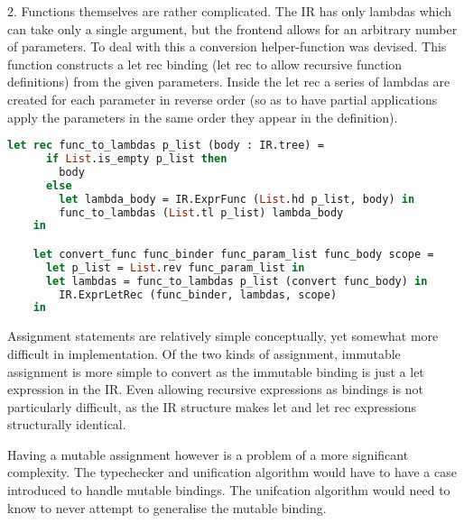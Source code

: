 \documentclass{l4proj}
\begin{document}
2. Functions themselves are rather complicated.
The IR has only lambdas which can take only a single argument, but the frontend allows for an arbitrary number of parameters.
To deal with this a conversion helper-function was devised.
This function constructs a let rec binding (let rec to allow recursive function definitions) from the given parameters.
Inside the let rec a series of lambdas are created for each parameter in reverse order (so as to have partial applications apply the parameters in the same order they appear in the definition).

\begin{lstlisting}[language=Caml, keepspaces=true, caption=PyFunc frontend's function binding conversion code.]
    let rec func_to_lambdas p_list (body : IR.tree) =
      if List.is_empty p_list then
        body
      else
        let lambda_body = IR.ExprFunc (List.hd p_list, body) in
        func_to_lambdas (List.tl p_list) lambda_body
    in

    let convert_func func_binder func_param_list func_body scope =
      let p_list = List.rev func_param_list in
      let lambdas = func_to_lambdas p_list (convert func_body) in
        IR.ExprLetRec (func_binder, lambdas, scope)
    in
\end{lstlisting}


Assignment statements are relatively simple conceptually, yet somewhat more difficult in implementation.
Of the two kinds of assignment, immutable assignment is more simple to convert as the immutable binding is just a let expression in the IR.
Even allowing recursive expressions as bindings is not particularly difficult, as the IR structure makes let and let rec expressions structurally identical.

Having a mutable assignment however is a problem of a more significant complexity.
The typechecker and unification algorithm would have to have a case introduced to handle mutable bindings.
The unifcation algorithm would need to know to never attempt to generalise the mutable binding.
\end{document}
